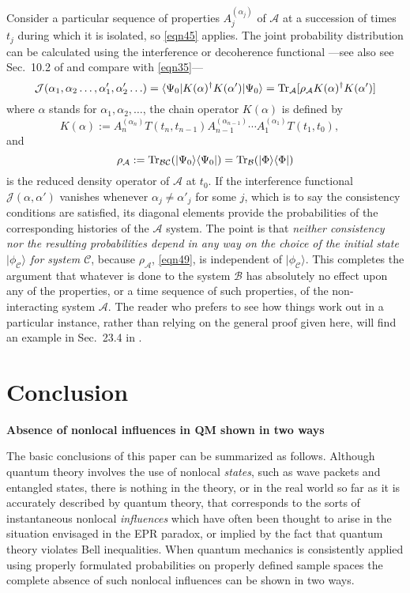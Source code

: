 \documentclass[10pt]{article} %
\def\outl#1{\par{\medskip\noindent\hspace*{.5cm}\bf
      \mathversion{bold}#1\mathversion{normal}\smallskip} }
\def\np{} \def\xa{} \def\xb{} \def\xn{} \def\xp{}
\def\outl#1{} \def\np{} \def\xa{} \def\xb{} \def\xn{} \def\xp{}
\def\outl#1{\par{\medskip\noindent\hspace*{.5cm}\bf
      \mathversion{bold}#1\mathversion{normal}\smallskip} }
\def\np{\newpage }\def\xn{\nopagebreak }\def\xp{\pagebreak }
\newcommand{\ad}{^\dagger }
\newcommand{\dya}[1]{|#1\rgl\lgl#1|}
\newcommand{\ket}[1]{|#1\rgl }
\newcommand{\lgl}{\langle }
\newcommand{\mte}[2]{\lgl#1|#2|#1\rgl }
\newcommand{\rgl}{\rangle }
\newcommand{\Tr}{{\rm Tr}}
\newcommand{\AM}{{\mathcal A}}
\newcommand{\BM}{{\mathcal B}}
\newcommand{\CM}{{\mathcal C}}
\newcommand{\JM}{{\mathcal J}}
\newcommand{\al}{\alpha }
\begin{document}
Consider a particular sequence of properties $A_j^{(\al_j)}$ of $\AM$ at a
succession of times $t_j$ during which it is isolated, so \eqref{eqn45}
applies.  The joint probability distribution can be calculated using the
interference or decoherence functional \cite{GMHr93}---see also see Sec.~10.2
of \cite{Grff02c} and compare with \eqref{eqn35}---
\begin{equation}
  \JM(\al_1,\al_2\ldots,\al'_1,\al'_2\ldots) =
  \mte{\Psi_0}{K(\al)\ad K(\al')} = \Tr_\AM[\rho_\AM K(\al)\ad K(\al')]
\label{eqn47}
\end{equation}
where $\al$ stands for $\al_1,\al_2,\ldots$, the chain operator $K(\al)$ is
defined by
\begin{equation}
  K(\al) := A_n^{(\al_n)}T(t_{n},t_{n-1})A_{n-1}^{(\al_{n-1})} \cdots 
  A_1^{(\al_1)} T(t_1,t_0), \quad
\label{eqn48}
\end{equation}
and 
\begin{equation}
\rho_\AM := \Tr_{\BM\CM}(\dya{\Psi_0})
 = \Tr_\BM( \dya{\Phi})  
\label{eqn49}
\end{equation}
is the reduced density operator of $\AM$ at $t_0$.  If the interference
functional $\JM(\al,\al')$ vanishes whenever $\al_j\neq \al'_j$ for some $j$,
which is to say the consistency conditions are satisfied, its diagonal
elements provide the probabilities of the corresponding histories of the $\AM$
system.  The point is that \emph{neither consistency nor the resulting
  probabilities depend in any way on the choice of the initial state
  $\ket{\phi_\CM}$ for system $\CM$}, because $\rho_\AM$, \eqref{eqn49}, is
independent of $\ket{\phi_\CM}$.  This completes the argument that whatever is
done to the system $\BM$ has absolutely no effect upon any of the properties,
or a time sequence of such properties, of the non-interacting system $\AM$.
The reader who prefers to see how things work out in a particular instance,
rather than relying on the general proof given here, will find an example in
Sec.~23.4 in \cite{Grff02c}.

\xb
\section{Conclusion}
\label{sct7}
\xa

\xb
\outl{Absence of nonlocal influences in QM shown in two ways}
\xa


The basic conclusions of this paper can be summarized as follows.  Although
quantum theory involves the use of nonlocal \emph{states}, such as wave
packets and entangled states, there is nothing in the theory, or in the real
world so far as it is accurately described by quantum theory, that corresponds
to the sorts of instantaneous nonlocal \emph{influences} which have often been
thought to arise in the situation envisaged in the EPR paradox, or implied by
the fact that quantum theory violates Bell inequalities.  When quantum
mechanics is consistently applied using properly formulated probabilities on
properly defined sample spaces the complete absence of such nonlocal
influences can be shown in two ways.
\end{document}
